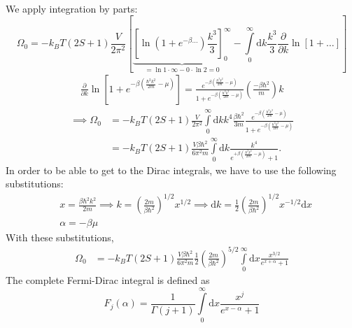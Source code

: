 \documentclass[11pt, a4paper]{article}
\newcommand{\dd}{\mathrm{d}}
\begin{document}
\begin{enumerate}
\begin{align*}
    \end{align*}
    We apply integration by parts:
    \begin{equation*}
        \Omega_0 = -k_BT (2S+1)\frac{V}{2\pi^2}
        \left[
            \underbrace{\left[\ln\left(1+e^{-\beta\dots}\right)\frac{k^3}{3}\right]_{0}^{\infty}}_{= \ln 1 \cdot \infty - 0\cdot\ln 2 = 0}
            - \int\limits_{0}^{\infty}\dd k \frac{k^3}{3} \frac{\partial}{\partial k}\ln\left[1 + \dots\right]
        \right]
    \end{equation*}
    \begin{align*}
        \frac{\partial}{\partial k}\ln\left[1+e^{-\beta\left(\frac{\hbar^2k^2}{2m} - \mu\right)}\right]
        = \frac{e^{-\beta\left(\frac{\hbar^2k^2}{2m} - \mu\right)}}{1+e^{-\beta\left(\frac{\hbar^2k^2}{2m} - \mu\right)}}
        \left(\frac{-\beta\hbar^2}{m}\right)k
    \end{align*}
    \begin{align*}
        \implies \Omega_0 &= -k_BT (2S+1)\frac{V}{2\pi^2} \int\limits_{0}^{\infty}\dd k
        k^4\frac{\beta\hbar^2}{3m} \frac{e^{-\beta\left(\frac{\hbar^2k^2}{2m} - \mu\right)}}{1+e^{-\beta\left(\frac{\hbar^2k^2}{2m} - \mu\right)}}\\
        & = -k_BT (2S+1)\frac{V\beta\hbar^2}{6\pi^2m}\int\limits_{0}^{\infty}\dd k \frac{k^4}{e^{+\beta\left(\frac{\hbar^2k^2}{2m} - \mu\right)}+1}.
    \end{align*}
    In order to be able to get to the Dirac integrals, we have to use the following substitutions:
    \begin{align*}
        &x = \frac{\beta\hbar^2k^2}{2m} \implies k = \left(\frac{2m}{\beta\hbar^2}\right)^{1/2}x^{1/2}
        \implies \dd k = \frac{1}{2}\left(\frac{2m}{\beta\hbar^2}\right)^{1/2} x^{-1/2}\dd x \\
        &\alpha = -\beta\mu
    \end{align*}
    With these substitutions,
    \begin{align*}
        \Omega_0 & = -k_BT (2S+1)\frac{V\beta\hbar^2}{6\pi^2m}\frac{1}{2}\left(\frac{2m}{\beta\hbar^2}\right)^{5/2}
        \int\limits_{0}^{\infty} \dd x \frac{x^{3/2}}{e^{x+\alpha}+1}
    \end{align*}
    The complete Fermi-Dirac integral is defined as 
    \begin{equation*}
        F_j(\alpha) = \frac{1}{\Gamma(j+1)}\int\limits_{0}^{\infty}\dd x \frac{x^j}{e^{x-\alpha}+1}
    \end{equation*}

\end{enumerate}
\end{document}
